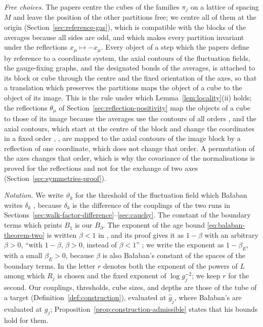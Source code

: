 \documentclass[11pt]{preprint}
\numberwithin{equation}{section}
\theoremstyle{definition}
\theoremstyle{remark}
\theoremstyle{plain}
\begin{document}
\emph{Free choices.} The papers centre the cubes of the families $\pi_j$ on a lattice of spacing $M$ \cite[p.~257]{BalabanRG1} and leave the position of the other partitions free; we centre all of them at the origin (Section~\ref{sec:reference-gas}), which is compatible with the blocks of the averages \cite[(0.3), p.~252]{BalabanRG1} because all sides are odd, and which makes every partition invariant under the reflections $x_\mu \mapsto -x_\mu$. Every object of a step which the papers define by reference to a coordinate system, the axial contours of the fluctuation fields, the gauge-fixing graphs, and the designated bonds of the averages, is attached to its block or cube through the centre and the fixed orientation of the axes, so that a translation which preserves the partitions maps the object of a cube to the object of its image. This is the rule under which Lemma~\ref{lem:locality}(ii) holds; the reflections $\theta_\mu$ of Section~\ref{sec:reflection-positivity} map the objects of a cube to those of its image because the averages use the contours of all orders \cite[p.~252]{BalabanRG1}, and the axial contours, which start at the centre of the block and change the coordinates in a fixed order \cite[(1.7), p.~18]{BalabanPRT1}, \cite[p.~275]{BalabanRG1}, are mapped to the axial contours of the image block by a reflection of one coordinate, which does not change that order. A permutation of the axes changes that order, which is why the covariance of the normalisations is proved for the reflections and not for the exchange of two axes (Section~\ref{sec:symmetries-proof}).

\emph{Notation.} We write $\vartheta_k$ for the threshold of the fluctuation field which Ba{\l}aban writes $\delta_k$ \cite[p.~265]{BalabanCRE}, because $\delta_k$ is the difference of the couplings of the two runs in Sections~\ref{sec:walk-factor-difference}--\ref{sec:cauchy}. The constant of the boundary terms which \cite[(2.47), p.~264]{BalabanCRE} prints $B_1$ is our $B_\partial$. The exponent of the age bound \eqref{eq:balaban-theorem-two} is written $\beta < 1$ in \cite[Theorem~2, p.~263]{BalabanCRE}, and its proof gives it as $1 - \beta$ with an arbitrary $\beta > 0$, ``with $1 - \beta$, $\beta > 0$, instead of $\beta < 1$'' \cite[p.~283]{BalabanCRE}; we write the exponent as $1 - \beta_E$, with a small $\beta_E > 0$, because $\beta$ is also Ba{\l}aban's constant of the spaces of the boundary terms. In \cite[(2.5), p.~255]{BalabanCRE} the letter $r$ denotes both the exponent of the powers of $L$ among which $R_j$ is chosen and the fixed exponent of $\log g_j^{-2}$; we keep $r$ for the second. Our couplings, thresholds, cube sizes, and depths are those of the tube of a target (Definition~\ref{def:construction}), evaluated at $\hat g_j$, where Ba{\l}aban's are evaluated at $g_j$; Proposition~\ref{prop:construction-admissible} states that his bounds hold for them.
\end{document}
